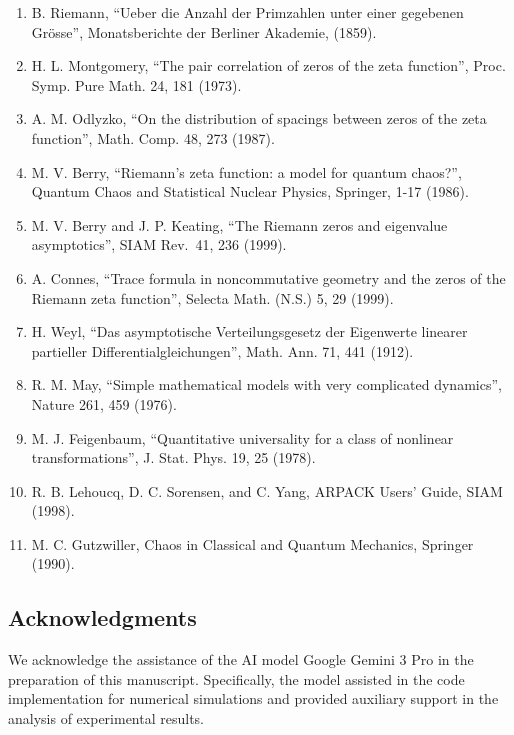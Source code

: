 \begin{enumerate}
\def\labelenumi{\arabic{enumi}.}
\item
  B. Riemann, ``Ueber die Anzahl der Primzahlen unter einer gegebenen
  Grösse'', Monatsberichte der Berliner Akademie, (1859).
\item
  H. L. Montgomery, ``The pair correlation of zeros of the zeta
  function'', Proc. Symp. Pure Math. 24, 181 (1973).
\item
  A. M. Odlyzko, ``On the distribution of spacings between zeros of the
  zeta function'', Math. Comp. 48, 273 (1987).
\item
  M. V. Berry, ``Riemann's zeta function: a model for quantum chaos?'',
  Quantum Chaos and Statistical Nuclear Physics, Springer, 1-17 (1986).
\item
  M. V. Berry and J. P. Keating, ``The Riemann zeros and eigenvalue
  asymptotics'', SIAM Rev.~41, 236 (1999).
\item
  A. Connes, ``Trace formula in noncommutative geometry and the zeros of
  the Riemann zeta function'', Selecta Math. (N.S.) 5, 29 (1999).
\item
  H. Weyl, ``Das asymptotische Verteilungsgesetz der Eigenwerte linearer
  partieller Differentialgleichungen'', Math. Ann. 71, 441 (1912).
\item
  R. M. May, ``Simple mathematical models with very complicated
  dynamics'', Nature 261, 459 (1976).
\item
  M. J. Feigenbaum, ``Quantitative universality for a class of nonlinear
  transformations'', J. Stat. Phys. 19, 25 (1978).
\item
  R. B. Lehoucq, D. C. Sorensen, and C. Yang, ARPACK Users' Guide, SIAM
  (1998).
\item
  M. C. Gutzwiller, Chaos in Classical and Quantum Mechanics, Springer
  (1990).
\end{enumerate}

\hypertarget{acknowledgments}{%
\subsection{\texorpdfstring{\textbf{Acknowledgments}}{Acknowledgments}}\label{acknowledgments}}

We acknowledge the assistance of the AI model Google Gemini 3 Pro in the
preparation of this manuscript. Specifically, the model assisted in the
code implementation for numerical simulations and provided auxiliary
support in the analysis of experimental results.

